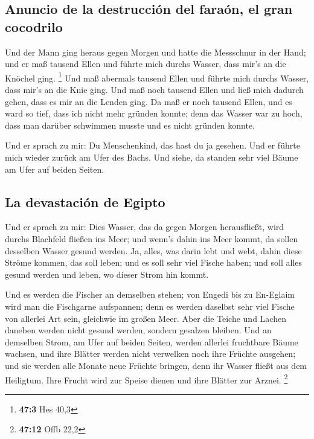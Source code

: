 \hypertarget{anuncio-de-la-destrucciuxf3n-del-farauxf3n-el-gran-cocodrilo}{%
\subsection{Anuncio de la destrucción del faraón, el gran
cocodrilo}\label{anuncio-de-la-destrucciuxf3n-del-farauxf3n-el-gran-cocodrilo}}

 Und der Mann ging heraus gegen Morgen und hatte die
Messschnur in der Hand; und er maß tausend Ellen und führte mich durchs
Wasser, dass mir's an die Knöchel ging. \footnote{\textbf{47:3} Hes 40,3}
 Und maß abermals tausend Ellen und führte mich durchs
Wasser, dass mir's an die Knie ging. Und maß noch tausend Ellen und ließ
mich dadurch gehen, dass es mir an die Lenden ging.  Da
maß er noch tausend Ellen, und es ward so tief, dass ich nicht mehr
gründen konnte; denn das Wasser war zu hoch, dass man darüber schwimmen
musste und es nicht gründen konnte.

 Und er sprach zu mir: Du Menschenkind, das hast du ja
gesehen. Und er führte mich wieder zurück am Ufer des Bachs.
 Und siehe, da standen sehr viel Bäume am Ufer auf beiden
Seiten.

\hypertarget{la-devastaciuxf3n-de-egipto}{%
\subsection{La devastación de
Egipto}\label{la-devastaciuxf3n-de-egipto}}

 Und er sprach zu mir: Dies Wasser, das da gegen Morgen
herausfließt, wird durchs Blachfeld fließen ins Meer; und wenn's dahin
ins Meer kommt, da sollen desselben Wasser gesund werden. 
Ja, alles, was darin lebt und webt, dahin diese Ströme kommen, das soll
leben; und es soll sehr viel Fische haben; und soll alles gesund werden
und leben, wo dieser Strom hin kommt.

 Und es werden die Fischer an demselben stehen; von
Engedi bis zu En-Eglaim wird man die Fischgarne aufspannen; denn es
werden daselbst sehr viel Fische von allerlei Art sein, gleichwie im
großen Meer.  Aber die Teiche und Lachen daneben werden
nicht gesund werden, sondern gesalzen bleiben.  Und an
demselben Strom, am Ufer auf beiden Seiten, werden allerlei fruchtbare
Bäume wachsen, und ihre Blätter werden nicht verwelken noch ihre Früchte
ausgehen; und sie werden alle Monate neue Früchte bringen, denn ihr
Wasser fließt aus dem Heiligtum. Ihre Frucht wird zur Speise dienen und
ihre Blätter zur Arznei. \footnote{\textbf{47:12} Offb 22,2}

